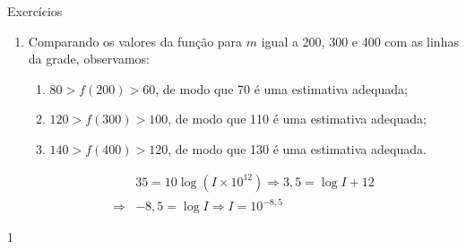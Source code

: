 \clearpage
\def\currentcolor{cor1}
\marginpar{\vspace{.5em}}
\begin{answer}{Exercícios}
{
	\exerciselist
	\begin{enumerate}
	\item Comparando os valores da função para $m$ igual a 200, 300 e 400 com as linhas da grade, observamos:
	\begin{enumerate}
	\item $80>f(200)>60$, de modo que 70 é uma estimativa adequada;
	\item $120>f(300)>100$, de modo que 110 é uma estimativa adequada;
	\item $140>f(400)>120$, de modo que 130 é uma estimativa adequada.
	\end{enumerate}

	\Item 
	\begin{align*}
	& 35 = 10 \log(I \times 10^{12}) \Rightarrow   3{,}5 = \log I + 12\\
	\Rightarrow & -8{,}5 = \log I \Rightarrow I = 10^{-8{,}5}
	\end{align*}
	\end{enumerate}
}{1}
\end{answer}
\clearmargin
